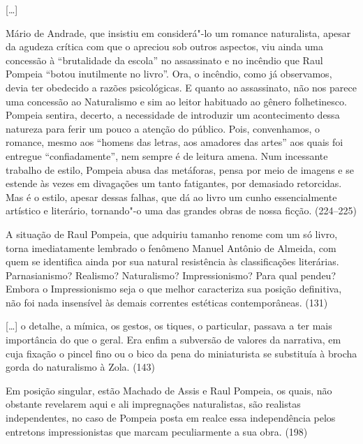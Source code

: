 [\ldots]

Mário de Andrade, que insistiu em considerá"-lo um romance naturalista,
apesar da agudeza crítica com que o apreciou sob outros aspectos, viu
ainda uma concessão à ``brutalidade da escola'' no assassinato e no
incêndio que Raul Pompeia ``botou inutilmente no livro''. Ora, o
incêndio, como já observamos, devia ter obedecido a razões
psicológicas. E quanto ao assassinato, não nos parece uma concessão ao
Naturalismo e sim ao leitor habituado ao gênero folhetinesco. Pompeia
sentira, decerto, a necessidade de introduzir um acontecimento dessa
natureza para ferir um pouco a atenção do público. Pois, convenhamos, o
romance, mesmo aos ``homens das letras, aos amadores das artes'' aos
quais foi entregue ``confiadamente'', nem sempre é de leitura amena. Num
incessante trabalho de estilo, Pompeia abusa das metáforas, pensa por
meio de imagens e se estende às vezes em divagações um tanto
fatigantes, por demasiado retorcidas. Mas é o estilo, apesar dessas
falhas, que dá ao livro um cunho essencialmente artístico e literário,
tornando"-o uma das grandes obras de nossa ficção. (224--225)



A situação de Raul Pompeia, que adquiriu tamanho renome com um só livro,
torna imediatamente lembrado o fenômeno Manuel Antônio de Almeida, com
quem se identifica ainda por sua natural resistência às classificações
literárias. Parnasianismo? Realismo? Naturalismo? Impressionismo? Para
qual pendeu? Embora o Impressionismo seja o que melhor caracteriza sua
posição definitiva, não foi nada insensível às demais correntes
estéticas contemporâneas. (131)

[\ldots] o detalhe, a mímica, os gestos, os tiques, o particular, passava a
ter mais importância do que o geral. Era enfim a subversão de valores
da narrativa, em cuja fixação o pincel fino ou o bico da pena do
miniaturista se substituía à brocha gorda do naturalismo à Zola. (143)



Em posição singular, estão Machado de Assis e Raul Pompeia, os quais,
não obstante revelarem aqui e ali impregnações naturalistas, são
realistas independentes, no  caso de Pompeia posta em realce essa
independência pelos entretons impressionistas que marcam peculiarmente
a sua obra.  (198)

